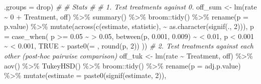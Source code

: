 \documentclass[
]{article}
\newenvironment{Shaded}{\begin{snugshade}}{\end{snugshade}}
\newcommand{\AttributeTok}[1]{\textcolor[rgb]{0.77,0.63,0.00}{#1}}
\newcommand{\CommentTok}[1]{\textcolor[rgb]{0.56,0.35,0.01}{\textit{#1}}}
\newcommand{\ConstantTok}[1]{\textcolor[rgb]{0.00,0.00,0.00}{#1}}
\newcommand{\DecValTok}[1]{\textcolor[rgb]{0.00,0.00,0.81}{#1}}
\newcommand{\FloatTok}[1]{\textcolor[rgb]{0.00,0.00,0.81}{#1}}
\newcommand{\FunctionTok}[1]{\textcolor[rgb]{0.00,0.00,0.00}{#1}}
\newcommand{\NormalTok}[1]{#1}
\newcommand{\OtherTok}[1]{\textcolor[rgb]{0.56,0.35,0.01}{#1}}
\newcommand{\SpecialCharTok}[1]{\textcolor[rgb]{0.00,0.00,0.00}{#1}}
\newcommand{\StringTok}[1]{\textcolor[rgb]{0.31,0.60,0.02}{#1}}
\begin{document}
\begin{Shaded}
\begin{Highlighting}[]
                \AttributeTok{.groups =} \StringTok{\textquotesingle{}drop\textquotesingle{}}\NormalTok{) }
\CommentTok{\#}
\CommentTok{\# Stats }
\CommentTok{\#}
\CommentTok{\# 1. Test treatments against 0. }
\NormalTok{  off\_sum }\OtherTok{\textless{}{-}}
    \FunctionTok{lm}\NormalTok{(rate }\SpecialCharTok{\textasciitilde{}} \DecValTok{0} \SpecialCharTok{+}\NormalTok{ Treatment, off) }\SpecialCharTok{\%\textgreater{}\%}
      \FunctionTok{summary}\NormalTok{() }\SpecialCharTok{\%\textgreater{}\%}
\NormalTok{      broom}\SpecialCharTok{::}\FunctionTok{tidy}\NormalTok{() }\SpecialCharTok{\%\textgreater{}\%}
      \FunctionTok{rename}\NormalTok{(}\AttributeTok{p =}\NormalTok{ p.value) }\SpecialCharTok{\%\textgreater{}\%}
      \FunctionTok{mutate}\NormalTok{(}\FunctionTok{across}\NormalTok{(}\FunctionTok{c}\NormalTok{(estimate, statistic), }\SpecialCharTok{\textasciitilde{}} \FunctionTok{as.character}\NormalTok{(}\FunctionTok{signif}\NormalTok{(., }\DecValTok{2}\NormalTok{))),}
             \AttributeTok{p =} \FunctionTok{case\_when}\NormalTok{(}
\NormalTok{                p }\SpecialCharTok{\textgreater{}=} \FloatTok{0.05} \SpecialCharTok{\textasciitilde{}} \StringTok{\textquotesingle{}\textgreater{} 0.05\textquotesingle{}}\NormalTok{,}
                \FunctionTok{between}\NormalTok{(p, }\FloatTok{0.001}\NormalTok{, }\FloatTok{0.009}\NormalTok{) }\SpecialCharTok{\textasciitilde{}} \StringTok{\textquotesingle{}\textless{} 0.01\textquotesingle{}}\NormalTok{, }
\NormalTok{                p }\SpecialCharTok{\textless{}} \FloatTok{0.001} \SpecialCharTok{\textasciitilde{}} \StringTok{\textquotesingle{}\textless{} 0.001\textquotesingle{}}\NormalTok{,}
                \ConstantTok{TRUE} \SpecialCharTok{\textasciitilde{}} \FunctionTok{paste0}\NormalTok{(}\StringTok{\textquotesingle{}= \textquotesingle{}}\NormalTok{, }\FunctionTok{round}\NormalTok{(p, }\DecValTok{2}\NormalTok{))   ))}
\CommentTok{\# 2. Test treatments against each other (post{-}hoc pairwise comparison)}
\NormalTok{  off\_tuk }\OtherTok{\textless{}{-}}
    \FunctionTok{lm}\NormalTok{(rate }\SpecialCharTok{\textasciitilde{}}\NormalTok{ Treatment, off) }\SpecialCharTok{\%\textgreater{}\%}
      \FunctionTok{aov}\NormalTok{() }\SpecialCharTok{\%\textgreater{}\%}
      \FunctionTok{TukeyHSD}\NormalTok{() }\SpecialCharTok{\%\textgreater{}\%}
\NormalTok{      broom}\SpecialCharTok{::}\FunctionTok{tidy}\NormalTok{() }\SpecialCharTok{\%\textgreater{}\%}
      \FunctionTok{rename}\NormalTok{(}\AttributeTok{p =}\NormalTok{ adj.p.value) }\SpecialCharTok{\%\textgreater{}\%}
      \FunctionTok{mutate}\NormalTok{(}\AttributeTok{estimate =} \FunctionTok{paste0}\NormalTok{(}\FunctionTok{signif}\NormalTok{(estimate, }\DecValTok{2}\NormalTok{)), }

\end{Highlighting}
\end{Shaded}
\end{document}
